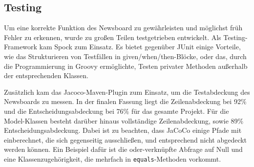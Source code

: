 \subsection{Testing}
Um eine korrekte Funktion des Newsboard zu gewährleisten und möglichst früh
Fehler zu erkennen, wurde zu großen Teilen testgetrieben entwickelt.
Als Testing-Framework kam Spock zum Einsatz. Es bietet gegenüber JUnit einige Vorteile,
wie das Strukturieren von Testfällen in given/when/then-Blöcke,
oder das, durch die Programmierung in Groovy ermöglichte, Testen privater Methoden
außerhalb der entsprechenden Klassen.

Zusätzlich kam das Jacoco-Maven-Plugin zum Einsatz, um die Testabdeckung des Newsboards
zu messen. In der finalen Fassung liegt die Zeilenabdeckung bei 92\%
und die Entscheidungsabdeckung bei 76\% für das gesamte Projekt.
Für die Model-Klassen besteht darüber hinaus vollständige Zeilenabdeckung,
sowie 89\% Entscheidungsabdeckung. Dabei ist zu beachten, dass JaCoCo einige Pfade
mit einberechnet, die sich gegenseitig ausschließen, und entsprechend
nicht abgedeckt werden können. Ein Beispiel dafür ist die oder-verknüpfte Abfrage
auf Null und eine Klassenzugehörigkeit, die mehrfach in \texttt{equals}-Methoden vorkommt.
